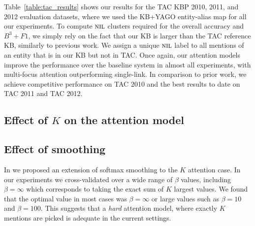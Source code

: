 Table~\ref{table:tac_results} shows our results for the TAC KBP 2010, 2011, and 2012
evaluation datasets, where we used the KB+YAGO entity-alias map for all our experiments. 
To compute $\mbox{\textsc{nil}}$ clusters required for the overall accuracy
and $B^3+F1$, we simply rely on the fact that our KB is larger than the TAC
reference KB, similarly to previous work. We assign a unique $\mbox{\textsc{nil}}$ label to
all mentions of an entity that is in our KB but not in TAC. 
Once again, our attention models improve the performance over the baseline
system in almost all experiments, with multi-focus attention outperforming single-link. In comparison to
prior work, we achieve competitive performance on TAC 2010 and the best
results to date on TAC 2011 and TAC 2012.


\subsection{Effect of $K$ on the attention model}


\subsection{Effect of smoothing}
In  we proposed an extension of softmax smoothing to the $K$ attention case. In our experiments 
we cross-validated over a wide range of $\beta$ values, including $\beta=\infty$ which corresponds to taking
the exact sum of $K$ largest values. We found that the optimal value in most cases was  $\beta=\infty$ or large values
such as $\beta=10$ and $\beta=100$. This suggests that a {\em hard} attention model, where exactly $K$ mentions are picked is adequate in the current settings.



%
%



